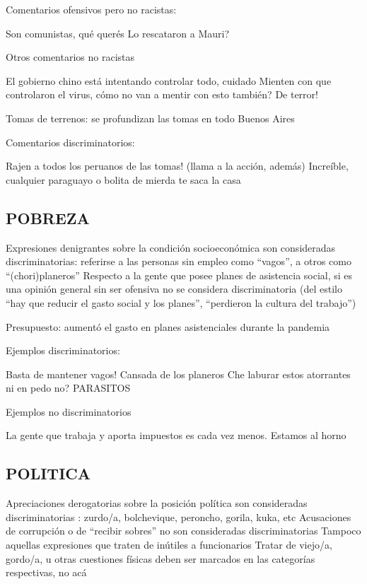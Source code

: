 Comentarios ofensivos pero no racistas:

Son comunistas, qué querés
Lo rescataron a Mauri?




Otros comentarios no racistas

El gobierno chino está intentando controlar todo, cuidado
Mienten con que controlaron el virus, cómo no van a mentir con esto también?
De terror! 


Tomas de terrenos: se profundizan las tomas en todo Buenos Aires


Comentarios discriminatorios:

Rajen a todos los peruanos de las tomas! (llama a la acción, además)
Increíble, cualquier paraguayo o bolita de mierda te saca la casa

\subsection{POBREZA}

Expresiones denigrantes sobre la condición socioeconómica son consideradas discriminatorias: referirse a las personas sin empleo como “vagos”, a otros como “(chori)planeros”
Respecto a la gente que posee planes de asistencia social, si es una opinión general sin ser ofensiva no se considera discriminatoria (del estilo “hay que reducir el gasto social y los planes”, “perdieron la cultura del trabajo”)

Presupuesto: aumentó el gasto en planes asistenciales durante la pandemia

Ejemplos discriminatorios:

Basta de mantener vagos!
Cansada de los planeros
Che laburar estos atorrantes ni en pedo no?
PARASITOS

Ejemplos no discriminatorios

La gente que trabaja y aporta impuestos es cada vez menos. Estamos al horno



\subsection{POLITICA}

Apreciaciones derogatorias sobre la posición política son consideradas discriminatorias : zurdo/a, bolchevique, peroncho, gorila, kuka, etc
Acusaciones de corrupción o de “recibir sobres” no son consideradas discriminatorias
Tampoco aquellas expresiones que traten de inútiles a funcionarios
Tratar de viejo/a, gordo/a, u otras cuestiones físicas deben ser marcados en las categorías respectivas, no acá

